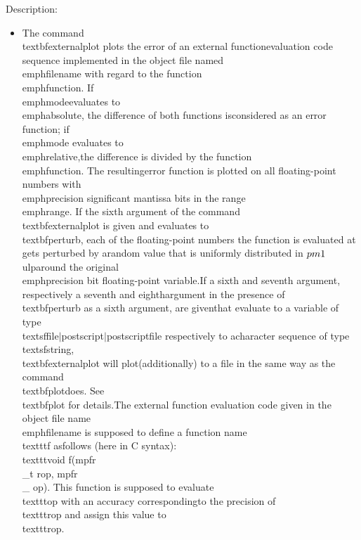 \noindent Description: \begin{itemize}

\item The command \\textbf{externalplot} plots the error of an external function\n   evaluation code sequence implemented in the object file named\n   \\emph{filename} with regard to the function \\emph{function}.  If \\emph{mode}\n   evaluates to \\emph{absolute}, the difference of both functions is\n   considered as an error function; if \\emph{mode} evaluates to \\emph{relative},\n   the difference is divided by the function \\emph{function}. The resulting\n   error function is plotted on all floating-point numbers with\n   \\emph{precision} significant mantissa bits in the range \\emph{range}. \n    \n   If the sixth argument of the command \\textbf{externalplot} is given and evaluates to\n   \\textbf{perturb}, each of the floating-point numbers the function is evaluated at gets perturbed by a\n   random value that is uniformly distributed in $\\pm1$ ulp\n   around the original \\emph{precision} bit floating-point variable.\n    \n   If a sixth and seventh argument, respectively a seventh and eighth\n   argument in the presence of \\textbf{perturb} as a sixth argument, are given\n   that evaluate to a variable of type \\textsf{file$|$postscript$|$postscriptfile} respectively to a\n   character sequence of type \\textsf{string}, \\textbf{externalplot} will plot\n   (additionally) to a file in the same way as the command \\textbf{plot}\n   does. See \\textbf{plot} for details.\n    \n   The external function evaluation code given in the object file name\n   \\emph{filename} is supposed to define a function name \\texttt{f} as\n   follows (here in C syntax): \\texttt{void f(mpfr\\_t rop, mpfr\\_ op)}. \n   This function is supposed to evaluate \\texttt{op} with an accuracy corresponding\n   to the precision of \\texttt{rop} and assign this value to\n   \\texttt{rop}.\n\end{itemize}
